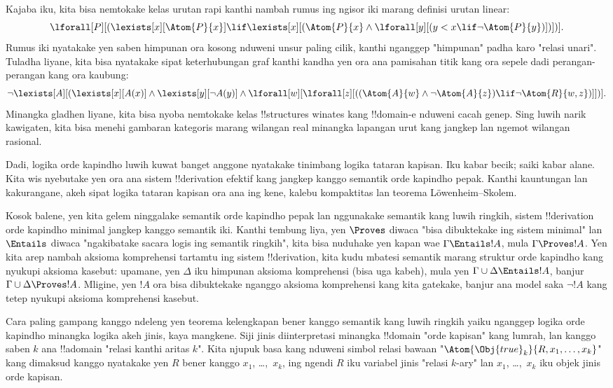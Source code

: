 \documentclass[../../../include/open-logic-section]{subfiles}
\begin{document}
Kajaba iku, kita bisa
nemtokake kelas urutan rapi
kanthi nambah rumus ing
ngisor iki marang definisi
urutan linear:
\[
\lforall[P][(\lexists[x][\Atom{P}{x}] \lif \lexists[x][(\Atom{P}{x}
    \land \lforall[y][(y < x \lif \lnot \Atom{P}{y})])])].
\]
Rumus iki nyatakake yen
saben himpunan ora kosong
nduweni unsur paling cilik,
kanthi nganggep "himpunan"
padha karo "relasi unari".
Tuladha liyane, kita bisa
nyatakake sipat keterhubungan
graf kanthi kandha yen ora
ana pamisahan titik kang
ora sepele dadi perangan-
perangan kang ora kaubung:
\[
\lnot \lexists[A][(\lexists[x][A(x)] \land \lexists[y][\lnot A(y)]
  \land \lforall[w][\lforall[z][((\Atom{A}{w} \land \lnot \Atom{A}{z})
      \lif \lnot \Atom{R}{w,z})]])].
\]
Minangka gladhen liyane,
kita bisa nyoba nemtokake
kelas !!{structure}s winates
kang !!{domain}-e nduweni
cacah genep. Sing luwih
narik kawigaten, kita bisa
menehi gambaran kategoris
marang wilangan real minangka
lapangan urut kang jangkep
lan ngemot wilangan rasional.

Dadi, logika orde kapindho
luwih kuwat banget anggone
nyatakake tinimbang logika tataran
kapisan. Iku kabar becik;
saiki kabar alane. Kita wis
nyebutake yen ora ana sistem
!!{derivation} efektif
kang jangkep kanggo semantik
orde kapindho pepak. Kanthi
kauntungan lan kakurangane,
akeh sipat logika tataran kapisan
ora ana ing kene, kalebu
kompaktitas lan teorema
L\"owenheim--Skolem.

Kosok balene, yen kita gelem
ninggalake semantik orde
kapindho pepak lan nggunakake
semantik kang luwih ringkih,
sistem !!{derivation}
orde kapindho minimal jangkep
kanggo semantik iki. Kanthi
tembung liya, yen $\Proves$
diwaca "bisa dibuktekake
ing sistem minimal" lan
$\Entails$ diwaca
"ngakibatake sacara logis
ing semantik ringkih",
kita bisa nuduhake yen
kapan wae $\Gamma \Entails !A$,
mula $\Gamma \Proves !A$.
Yen kita arep nambah aksioma
komprehensi tartamtu ing
sistem !!{derivation},
kita kudu mbatesi semantik
marang struktur orde
kapindho kang nyukupi
aksioma kasebut: upamane,
yen $\Delta$ iku himpunan
aksioma komprehensi
(bisa uga kabeh), mula yen
$\Gamma
\cup \Delta \Entails !A$,
banjur $\Gamma \cup \Delta \Proves !A$.
Mligine, yen $!A$ ora
bisa dibuktekake nganggo
aksioma komprehensi kang
kita gatekake, banjur
ana model saka $\lnot !A$
kang tetep nyukupi
aksioma komprehensi kasebut.

Cara paling gampang kanggo
ndeleng yen teorema
kelengkapan bener kanggo
semantik kang luwih ringkih
yaiku nganggep logika orde
kapindho minangka logika
akeh jinis, kaya mangkene.
Siji jinis diinterpretasi
minangka !!{domain}
"orde kapisan" kang lumrah,
lan kanggo saben $k$
ana !!a{domain} "relasi
kanthi aritas $k$".
Kita njupuk basa kang
nduweni simbol relasi
bawaan "$\Atom{\Obj{true}_k}{R,x_1,\dots,x_k}$"
kang dimaksud kanggo
nyatakake yen $R$ bener
kanggo $x_1$, \dots,~$x_k$,
ing ngendi $R$ iku
variabel jinis "relasi
$k$-ary" lan $x_1$,
\dots,~$x_k$ iku objek
jinis orde kapisan.
\end{document}
